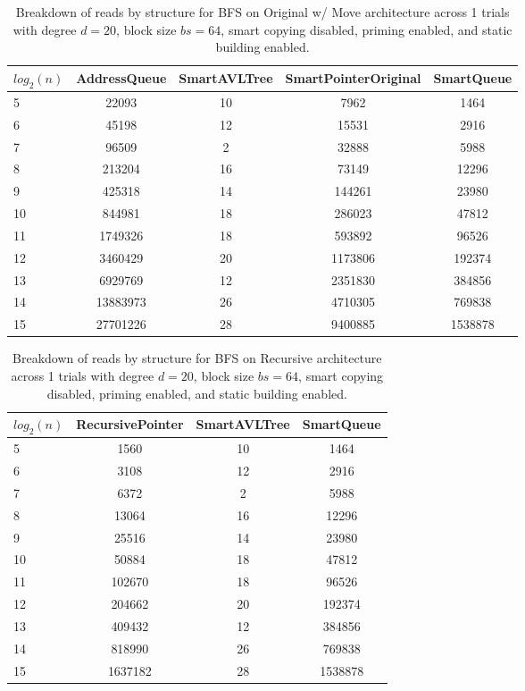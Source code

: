 \begin{table}[]
\centering
\begin{tabular}{|l|c|c|c|c|}
$log_2(n)$ & AddressQueue & SmartAVLTree & SmartPointerOriginal & SmartQueue \\ \hline
5 & 22093 & 10 & 7962 & 1464 \\ \hline
6 & 45198 & 12 & 15531 & 2916 \\ \hline
7 & 96509 & 2 & 32888 & 5988 \\ \hline
8 & 213204 & 16 & 73149 & 12296 \\ \hline
9 & 425318 & 14 & 144261 & 23980 \\ \hline
10 & 844981 & 18 & 286023 & 47812 \\ \hline
11 & 1749326 & 18 & 593892 & 96526 \\ \hline
12 & 3460429 & 20 & 1173806 & 192374 \\ \hline
13 & 6929769 & 12 & 2351830 & 384856 \\ \hline
14 & 13883973 & 26 & 4710305 & 769838 \\ \hline
15 & 27701226 & 28 & 9400885 & 1538878 \\ \hline
\end{tabular}
\caption{Breakdown of reads by structure for BFS on Original w/ Move architecture across 1 trials with degree $d=20$, block size $bs=64$, smart copying disabled, priming enabled, and static building enabled.}
    \label{tab:reads_by_structure_bfs_d20_bs64_trials1_copiesfalse_primetrue_staticinsertiontrue_ptoriginal_movetrue}
\end{table}

\begin{table}[]
\centering
\begin{tabular}{|l|c|c|c|}
$log_2(n)$ & RecursivePointer & SmartAVLTree & SmartQueue \\ \hline
5 & 1560 & 10 & 1464 \\ \hline
6 & 3108 & 12 & 2916 \\ \hline
7 & 6372 & 2 & 5988 \\ \hline
8 & 13064 & 16 & 12296 \\ \hline
9 & 25516 & 14 & 23980 \\ \hline
10 & 50884 & 18 & 47812 \\ \hline
11 & 102670 & 18 & 96526 \\ \hline
12 & 204662 & 20 & 192374 \\ \hline
13 & 409432 & 12 & 384856 \\ \hline
14 & 818990 & 26 & 769838 \\ \hline
15 & 1637182 & 28 & 1538878 \\ \hline
\end{tabular}
\caption{Breakdown of reads by structure for BFS on Recursive architecture across 1 trials with degree $d=20$, block size $bs=64$, smart copying disabled, priming enabled, and static building enabled.}
    \label{tab:reads_by_structure_bfs_d20_bs64_trials1_copiesfalse_primetrue_staticinsertiontrue_ptrecursive_movetrue}
\end{table}


